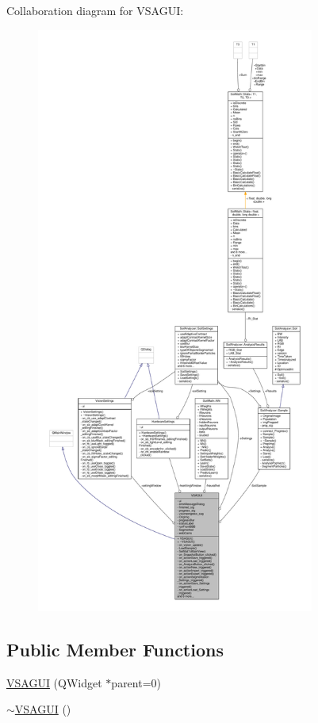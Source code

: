 Collaboration diagram for V\+S\+A\+G\+U\+I\+:
\nopagebreak
\begin{figure}[H]
\begin{center}
\leavevmode
\includegraphics[height=550pt]{class_v_s_a_g_u_i__coll__graph}
\end{center}
\end{figure}
\subsection*{Public Member Functions}
\begin{DoxyCompactItemize}
\item 
\hyperlink{class_v_s_a_g_u_i_a987a20380023fe5985bd1fef0491af40}{V\+S\+A\+G\+U\+I} (Q\+Widget $\ast$parent=0)
\item 
\hyperlink{class_v_s_a_g_u_i_ac68bb20d33069fc7f437e7daed3fcc0d}{$\sim$\+V\+S\+A\+G\+U\+I} ()
\end{DoxyCompactItemize}

